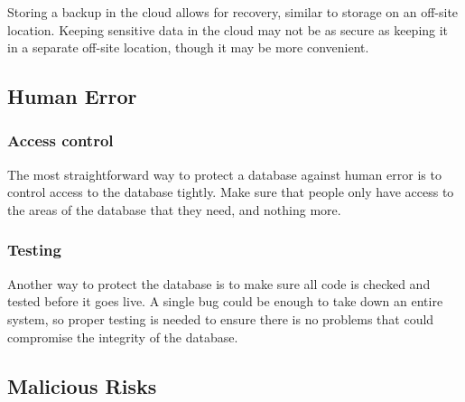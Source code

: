\documentclass[11pt]{article}
\begin{document}
Storing a backup in the cloud allows for recovery, similar to storage on an off-site location. Keeping sensitive data in the cloud may not be as secure as keeping it in a separate off-site location\cite{cloud}, though it may be more convenient.

\subsection{Human Error}
\subsubsection{Access control}
The most straightforward way to protect a database against human error is to control access to the database tightly. Make sure that people only have access to the areas of the database that they need, and nothing more. 

\subsubsection{Testing}

Another way to protect the database is to make sure all code is checked and tested before it goes live. A single bug could be enough to take down an entire system, so proper testing is needed to ensure there is no problems that could compromise the integrity of the database.

\subsection{Malicious Risks}
\end{document}
